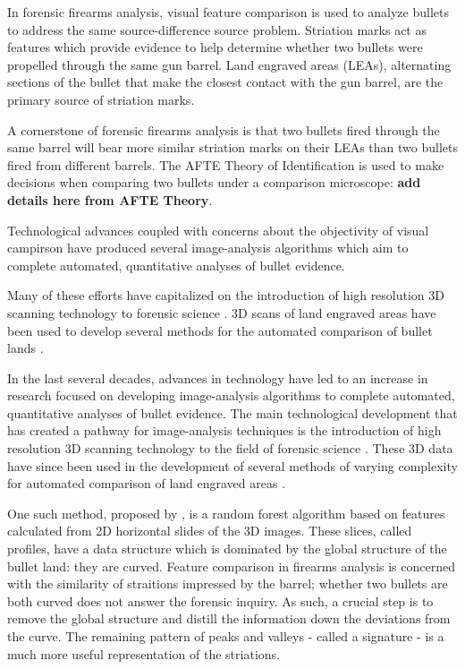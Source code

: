 \documentclass[12pt]{article}
\begin{document}
In forensic firearms analysis, visual feature comparison is used to
analyze bullets to address the same source-difference source problem.
Striation marks act as features which provide evidence to help determine
whether two bullets were propelled through the same gun barrel. Land
engraved areas (LEAs), alternating sections of the bullet that make the
closest contact with the gun barrel, are the primary source of striation
marks.

A cornerstone of forensic firearms analysis is that two bullets fired
through the same barrel will bear more similar striation marks on their
LEAs than two bullets fired from different barrels. The AFTE Theory of
Identification \citep{AFTE} is used to make decisions when comparing two
bullets under a comparison microscope: \textbf{add details here from
AFTE Theory}.

Technological advances coupled with concerns about the objectivity of
visual campirson have produced several image-analysis algorithms which
aim to complete automated, quantitative analyses of bullet evidence.

Many of these efforts have capitalized on the introduction of high
resolution 3D scanning technology to forensic science
\citep[see][]{DeKinder1, DeKinder2, Bachrach1}. 3D scans of land
engraved areas have been used to develop several methods for the
automated comparison of bullet lands
\citep[e.g.][]{Ma1, Chu1, Chu2, Hare1}.

In the last several decades, advances in technology have led to an
increase in research focused on developing image-analysis algorithms to
complete automated, quantitative analyses of bullet evidence. The main
technological development that has created a pathway for image-analysis
techniques is the introduction of high resolution 3D scanning technology
to the field of forensic science
\citep[e.g.][]{DeKinder1, DeKinder2, Bachrach1}. These 3D data have
since been used in the development of several methods of varying
complexity for automated comparison of land engraved areas
\citep[e.g.][]{Chu1, Chu2, Hare1}.

One such method, proposed by \citet{Hare1}, is a random forest algorithm
based on features calculated from 2D horizontal slides of the 3D images.
These slices, called profiles, have a data structure which is dominated
by the global structure of the bullet land: they are curved. Feature
comparison in firearms analysis is concerned with the similarity of
straitions impressed by the barrel; whether two bullets are both curved
does not answer the forensic inquiry. As such, a crucial step is to
remove the global structure and distill the information down the
deviations from the curve. The remaining pattern of peaks and valleys -
called a signature - is a much more useful representation of the
striations.
\end{document}
